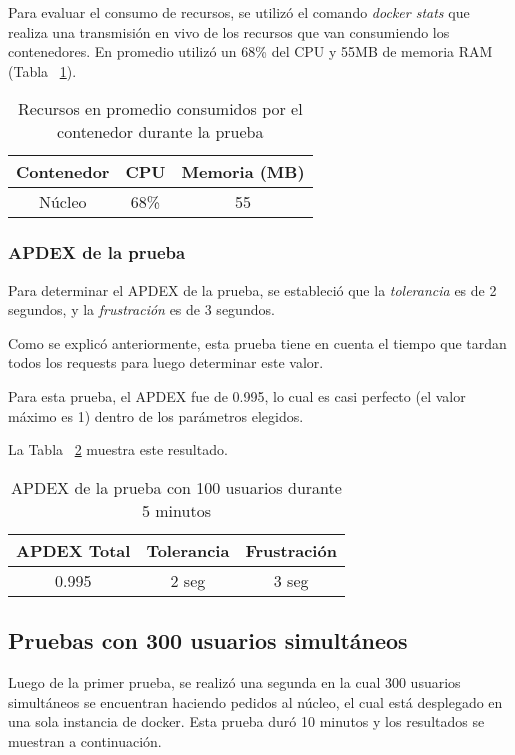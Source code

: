 Para evaluar el consumo de recursos, se utilizó el comando \textit{docker stats} que realiza una transmisión en vivo de los recursos que van consumiendo los contenedores.
En promedio utilizó un 68\% del CPU y 55MB de memoria RAM (Tabla ~\ref{tab:100u_5m_rec}).


\begin{table}[!htbp]
    \centering
    \makegapedcells
    \begin{tabular}{|c|c|c|}
    \hline
    Contenedor & CPU & Memoria (MB)\\ \hline
    Núcleo & 68\% & 55 \\ \hline
    \end{tabular}
    \caption{Recursos en promedio consumidos por el contenedor durante la prueba}
    \label{tab:100u_5m_rec}
\end{table}


\subsubsection{APDEX de la prueba}

Para determinar el APDEX de la prueba, se estableció que la \textit{tolerancia} es de 2 segundos, y la \textit{frustración} es de 3 segundos. 

Como se explicó anteriormente, esta prueba tiene en cuenta el tiempo que tardan todos los requests para luego determinar este valor.

Para esta prueba, el APDEX fue de 0.995, lo cual es casi perfecto (el valor máximo es 1) dentro de los parámetros elegidos.

La Tabla ~\ref{tab:100u_5m_apdex} muestra este resultado.

\begin{table}[!htbp]
    \centering
    \makegapedcells
    \begin{tabular}{|c|c|c|}
    \hline
    APDEX Total & Tolerancia & Frustración\\ \hline
    0.995 & 2 seg & 3 seg \\ \hline
    \end{tabular}
    \caption{APDEX de la prueba con 100 usuarios durante 5 minutos}
    \label{tab:100u_5m_apdex}
\end{table}

\break

\subsection{Pruebas con 300 usuarios simultáneos}
Luego de la primer prueba, se realizó una segunda en la cual 300 usuarios simultáneos se encuentran haciendo pedidos al núcleo, el cual está desplegado en una sola instancia de docker.
Esta prueba duró 10 minutos y los resultados se muestran a continuación.

